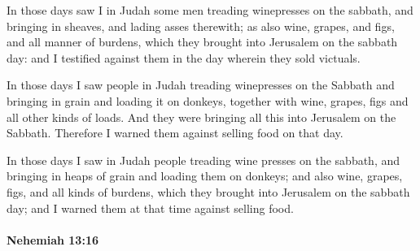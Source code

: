 			\begin{versebox}
					\item[BHS] 
					\item[LXX] 
					\item[ASV] In those days saw I in Judah some men treading winepresses on the sabbath, and bringing in sheaves, and lading asses therewith; as also wine, grapes, and figs, and all manner of burdens, which they brought into Jerusalem on the sabbath day: and I testified against them in the day wherein they sold victuals.
					\item[NIV] In those days I saw people in Judah treading winepresses on the Sabbath and bringing in grain and loading it on donkeys, together with wine, grapes, figs and all other kinds of loads. And they were bringing all this into Jerusalem on the Sabbath. Therefore I warned them against selling food on that day.
					\item[NRSV] In those days I saw in Judah people treading wine presses on the sabbath, and bringing in heaps of grain and loading them on donkeys; and also wine, grapes, figs, and all kinds of burdens, which they brought into Jerusalem on the sabbath day; and I warned them at that time against selling food.
			\end{versebox}

		\paragraph{Nehemiah 13:16} %
			\label{NEHEMIAH-13-16}

